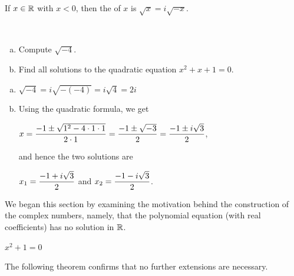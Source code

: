\documentclass[11pt,fleqn,dvipsnames,usenames]{article}
\newcommand{\p}{\noindent}
\begin{document}
\begin{definition}
If $x\in\mathbb{R}$ with $x < 0$, then the  of $x$ is $\sqrt{x} = i\sqrt{-x}$.
\end{definition}
%
\begin{examples}~
\begin{enumerate}[(a)]
\item Compute $\sqrt{-4}$.
\item Find all solutions to the quadratic equation $x^2 + x + 1 = 0$.
\end{enumerate}
\end{examples}
%
\begin{solution}
\begin{enumerate}[(a)]
\item $\sqrt{-4} = i\sqrt{-(-4)} = i\sqrt{4} = 2i$
\item Using the quadratic formula, we get
\begin{center}
$\displaystyle{x = \frac{-1 \pm \sqrt{1^2 - 4\cdot 1\cdot 1}}{2\cdot 1} = \frac{-1 \pm \sqrt{-3}}{2} = \frac{-1 \pm i\sqrt{3}}{2}}$,
\end{center}
and hence the two solutions are
\begin{center}
$\displaystyle{x_{1} = \frac{-1 +i\sqrt{3}}{2}}$ and $\displaystyle{x_{2} = \frac{-1 -i\sqrt{3}}{2}}$.
\end{center}
\end{enumerate}
\end{solution}
%
\p We began this section by examining the motivation behind the construction of the complex numbers, namely, that the polynomial equation (with real coefficients) has no solution in $\mathbb{R}$.
\begin{center}
$x^2 + 1 = 0$
\end{center}
The following theorem confirms that no further extensions are necessary.
\end{document}
